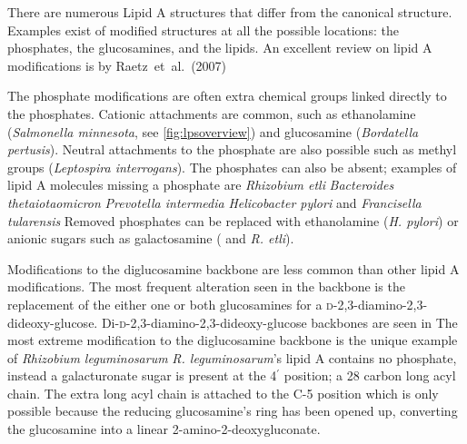 There are numerous Lipid A structures that differ from the canonical structure. Examples exist of modified structures at all the possible locations: the phosphates, the
glucosamines, and the lipids. An excellent review on lipid A modifications is by Raetz~et~al.~(2007)

 The phosphate modifications are often extra chemical groups linked directly to the phosphates. Cationic attachments are common, such as ethanolamine (\eg \textit{Salmonella
minnesota}, see \cref{fig:lpsoverview}) and glucosamine (\eg \textit{Bordatella pertusis}). Neutral attachments to the phosphate are also possible
such as methyl groups (\eg \textit{Leptospira interrogans}). The phosphates can also be absent; examples of lipid A molecules missing a phosphate
are \textit{Rhizobium etli} \textit{Bacteroides thetaiotaomicron} \textit{Prevotella intermedia}
\textit{Helicobacter pylori} and \textit{Francisella tularensis} Removed phosphates can be replaced with ethanolamine
(\eg \textit{H. pylori}) or anionic sugars such as galactosamine (\eg \caulobacter{} and \textit{R.
etli}).
 
Modifications to the diglucosamine backbone are less common than other lipid A modifications. The most frequent alteration seen in the backbone is the replacement of the either one
or both glucosamines for a \textsc{d}-2,3-diamino-2,3-dideoxy-glucose. Di-\textsc{d}-2,3-diamino-2,3-dideoxy-glucose backbones are seen in \caulobacter{}
The most extreme modification to the diglucosamine backbone is the unique example of \textit{Rhizobium leguminosarum} \textit{R. leguminosarum}'s lipid
A contains no phosphate, instead a galacturonate sugar is present at the 4$^\prime$ position; a 28 carbon long acyl chain. The extra long acyl chain is attached to the C-5 position
which is only possible because the reducing glucosamine's ring has been opened up, converting the glucosamine into a linear 2-amino-2-deoxygluconate.

